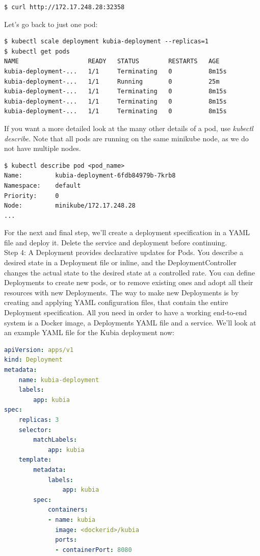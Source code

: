 \documentclass[a4paper,10pt]{article}
\begin{document}
\begin{lstlisting}[numbers=none, basicstyle=\ttfamily]
$ curl http://172.17.248.28:32358
\end{lstlisting}

Let's go back to just one pod:

\begin{lstlisting}[numbers=none, basicstyle=\ttfamily]
$ kubectl scale deployment kubia-deployment --replicas=1
$ kubectl get pods
NAME                   READY   STATUS        RESTARTS   AGE
kubia-deployment-...   1/1     Terminating   0          8m15s
kubia-deployment-...   1/1     Running       0          25m
kubia-deployment-...   1/1     Terminating   0          8m15s
kubia-deployment-...   1/1     Terminating   0          8m15s
kubia-deployment-...   1/1     Terminating   0          8m15s
\end{lstlisting}

If you want a more detailed look at the many other details of a pod, use \textit{kubectl describe}. Note that all pods are running on the same minikube node, as we do not have multiple nodes.

\begin{lstlisting}[numbers=none, basicstyle=\ttfamily]
$ kubectl describe pod <pod_name>
Name:         kubia-deployment-6fdb84979b-7krb8
Namespace:    default
Priority:     0
Node:         minikube/172.17.248.28
...
\end{lstlisting}

For the next and final step, we'll create a deployment specification in a YAML file and deploy it. Delete the service and deployment before continuing. \\

Step 4: A Deployment provides declarative updates for Pods. You describe a desired state in a Deployment file or inline, and the DeploymentController changes the actual state to the desired state at a controlled rate. You can define Deployments to create new pods, or to remove existing ones and adopt all their resources with new Deployments. The way to make new Deployments is by creating and applying YAML configuration files, that contain the entire Deployment specification. All you need in order to have a working end-to-end system is a Docker image, a Deployments YAML file and a service. We'll look at an example YAML file for the Kubia deployment now:

\newpage

\begin{lstlisting}[language=yaml, numbers=none, frame=single]
apiVersion: apps/v1
kind: Deployment
metadata:
	name: kubia-deployment
	labels:
		app: kubia
spec:
	replicas: 3
	selector:
		matchLabels:
			app: kubia
	template:
		metadata:
			labels:
				app: kubia
		spec:
			containers:
			- name: kubia
			  image: <dockerid>/kubia
			  ports:
			  - containerPort: 8080
\end{lstlisting}
\end{document}

